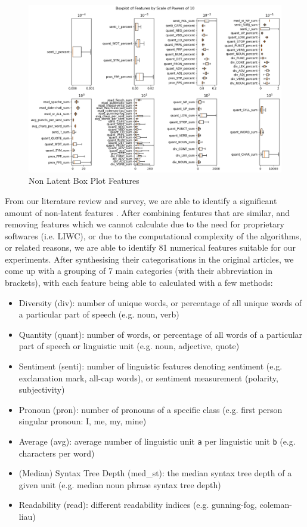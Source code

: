 \documentclass{article}
\begin{document}
 \label{section:non-latent-feat}

\begin{figure}[h]
  \centering
  \includegraphics[width=\textwidth]{img/non_latent_box_plot.png}
  \caption{Non Latent Box Plot Features}
  \label{box-plot}
\end{figure}

From our literature review and survey, we are able to identify a significant amount of non-latent features \cite{zhou2020survey, garg2022linguistic, horne2017}. After combining features that are similar, and removing features which we cannot calculate due to the need for proprietary softwares (i.e. LIWC), or due to the computational complexity of the algorithms, or related reasons, we are able to identify 81 numerical features suitable for our experiments. After synthesising their categorisations in the original articles, we come up with a grouping of 7 main categories (with their abbreviation in brackets), with each feature being able to calculated with a few methods:
\begin{itemize}
  \item Diversity (div): number of unique words, or percentage of all unique words of a particular part of speech (e.g. noun, verb)
  \item Quantity (quant): number of words, or percentage of all words of a particular part of speech or linguistic unit (e.g. noun, adjective, quote)
  \item Sentiment (senti): number of linguistic features denoting sentiment (e.g. exclamation mark, all-cap words), or sentiment measurement (polarity, subjectivity)
  \item Pronoun (pron): number of pronouns of a specific class (e.g. first person singular pronoun: I, me, my, mine)
  \item Average (avg): average number of linguistic unit \texttt{a} per linguistic unit \texttt{b} (e.g. characters per word)
  \item (Median) Syntax Tree Depth (med\_st): the median syntax tree depth of a given unit (e.g. median noun phrase syntax tree depth)
  \item Readability (read): different readability indices (e.g. gunning-fog, coleman-liau)
\end{itemize}
\end{document}
